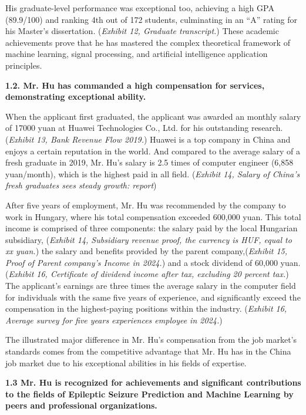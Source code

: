 \documentclass{article}
\begin{document}
His graduate-level performance was exceptional too, achieving a high GPA (89.9/100) and ranking 4th out of 172 students, culminating in an “A” rating for his Master’s dissertation. ({\it Exhibit 12, Graduate transcript.}) These academic achievements prove that he has mastered the complex theoretical framework of machine learning, signal processing, and artificial intelligence application principles.

{\bf 1.2. Mr. Hu has commanded a high compensation for services, demonstrating exceptional ability. }

When the applicant first graduated, the applicant was awarded an monthly salary of 17000 yuan at Huawei Technologies Co., Ltd. for his outstanding research. ({\it Exhibit 13, Bank Revenue Flow 2019.}) Huawei is a top company in China and enjoys a certain reputation in the world. And compared to the average salary of a fresh graduate in 2019, Mr. Hu's salary is 2.5 times of computer engineer (6,858 yuan/month), which is the highest paid in all field. ({\it Exhibit 14, Salary of China's fresh graduates sees steady growth: report})

After five years of employment, Mr. Hu was recommended by the company to work in Hungary, where his total compensation exceeded 600,000 yuan. This total income is comprised of three components: the salary paid by the local Hungarian subsidiary,  ({\it Exhibit 14, Subsidiary revenue proof, the currency is HUF, equal to xx yuan.}) the salary and benefits provided by the parent company,({\it Exhibit 15, Proof of Parent company's Income in 2024.}) and a stock dividend of 60,000 yuan. ({\it Exhibit 16, Certificate of dividend income after tax, excluding 20 percent tax.}) The applicant's earnings are three times the average salary in the computer field for individuals with the same five years of experience, and significantly exceed the compensation in the highest-paying positions within the industry. ({\it Exhibit 16, Average survey for five years experiences employee in 2024.})

The illustrated major difference in Mr. Hu's compensation from the job market's standards comes from the competitive advantage that Mr. Hu has in the China job market due to his exceptional abilities in his fields of expertise. 

{\bf 1.3 Mr. Hu is recognized for achievements and significant contributions to the fields of Epileptic Seizure Prediction and Machine Learning by peers and professional organizations. }
\end{document}
